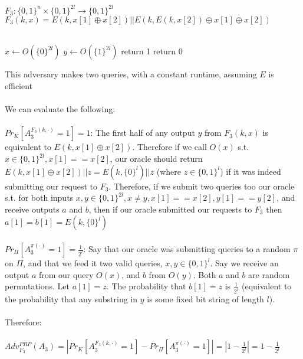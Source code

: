 \documentclass[]{article}
\begin{document}
\subsection{}
$F_3: \{0,1\}^n \times \{0,1\}^{2l} \rightarrow \{0,1\}^{2l}$
\\
$F_3(k, x) = E(k, x[1] \oplus x[2]) || E(k, E(k, x[2]) \oplus x[1] \oplus x[2])$
\\\\
\begin{algorithm}[H]
	\SetAlgoLined
	$x \leftarrow  O(\{0\}^{2l})$\;
	$y \leftarrow  O(\{1\}^{2l})$\;
	 {
		return 1
	}
	return 0
	\caption{$A_3$}
\end{algorithm}
This adversary makes two queries, with a constant runtime, assuming $E$ is efficient
\\\\
We can evaluate the following:
\\\\
$Pr_K[A_3^{F_3(k, \cdot)} = 1] = 1$: The first half of any output $y$ from $F_3(k, x)$ is equivalent to $E(k, x[1] \oplus x[2])$. Therefore if we call $O(x)$ s.t. $x \in \{0,1\}^{2l}, x[1] == x[2]$, our oracle should return $E(k, x[1] \oplus x[2]) || z = E(k, \{0\}^l) || z$ (where $z \in \{0,1\}^l$) if it was indeed submitting our request to $F_3$. Therefore, if we submit two queries too our oracle s.t. for both inputs $x, y \in \{0,1\}^{2l}, x \neq y, x[1] == x[2], y[1] == y[2]$,  and receive outputs $a$ and $b$, then if our oracle submitted our requests to $F_3$ then $a[1] = b[1] = E(k, \{0\}^l)$
\\\\
$Pr_\Pi[A_3^{\pi(\cdot)} = 1] = \frac{1}{2^l}$: Say that our oracle was submitting queries to a random $\pi$ on $\Pi$, and that we feed it two valid queries, $x, y \in \{0,1\}^l$. Say we receive an output $a$ from our query $O(x)$, and $b$ from $O(y)$. Both $a$ and $b$ are random permutations. Let $a[1] = z$. The probability that $b[1] = z$ is $\frac{1}{2^l}$ (equivalent to the probability that any substring in $y$ is some fixed bit string of length $l$).
\\\\
Therefore:
\\\\
$Adv_{F_3}^{PRP}(A_3) = |Pr_K[A_3^{F_3(k, \cdot)} = 1] - Pr_\Pi[A_3^{\pi(\cdot)} = 1]| = |1 - \frac{1}{2^l}| = 1 - \frac{1}{2^l}$
\end{document}
